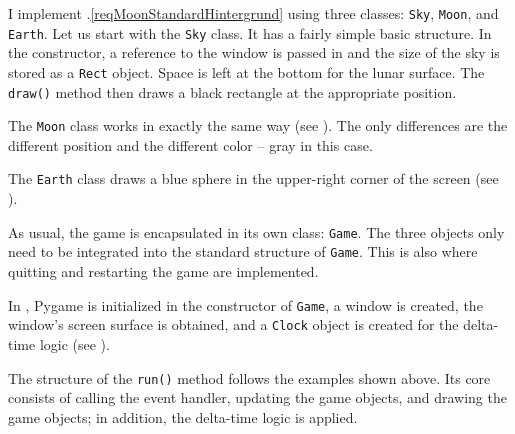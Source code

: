 

I implement .\ref{reqMoonStandardHintergrund} using three classes: \texttt{Sky}, \texttt{Moon}, and \texttt{Earth}. Let us start with the \texttt{Sky} class. It has a fairly simple basic structure. In the constructor, a reference to the window is passed in and the size of the sky is stored as a \texttt{Rect} object. Space is left at the bottom for the lunar surface. The \texttt{draw()} method then draws a black rectangle at the appropriate position.


The \texttt{Moon} class works in exactly the same way (see ). The only differences are the different position and the different color -- gray in this case.


The \texttt{Earth} class draws a blue sphere in the upper-right corner of the screen (see ).


As usual, the game is encapsulated in its own class: \texttt{Game}. The three objects only need to be integrated into the standard structure of \texttt{Game}. This is also where quitting and restarting the game are implemented.

In , Pygame is initialized in the constructor of \texttt{Game}, a window is created, the window’s screen surface is obtained, and a \texttt{Clock} object is created for the delta-time logic (see ).


The structure of the \texttt{run()} method follows the examples shown above. Its core consists of calling the event handler, updating the game objects, and drawing the game objects; in addition, the delta-time logic is applied.

